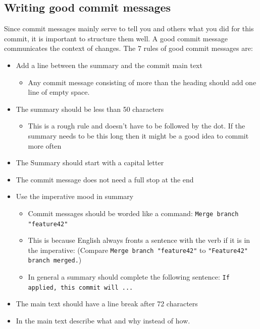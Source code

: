 \documentclass{article}
\begin{document}
	\subsection{Writing good commit messages}
	Since commit messages mainly serve to tell you and others what you did for this commit, it is important to structure them well. A good commit message communicates the context of changes. The 7 rules of good commit messages are:
	\begin{itemize}
		\item{Add a line between the summary and the commit main text}
		\begin{itemize}
			\item{Any commit message consisting of more than the heading should add one line of empty space.}
		\end{itemize}
		\item{The summary should be less than 50 characters}
		\begin{itemize}
			\item{This is a rough rule and doesn't have to be followed by the dot. If the summary needs to be this long then it might be a good idea to commit more often}
		\end{itemize}
		\item{The Summary should start with a capital letter}
		\item{The commit message does not need a full stop at the end}
		\item{Use the imperative mood in summary}
		\begin{itemize}
			\item{Commit messages should be worded like a command: \texttt{Merge branch "feature42"}}
			\item{This is because English always fronts a sentence with the verb if it is in the imperative: (Compare \texttt{Merge branch "feature42"} to \texttt{"Feature42" branch merged.})}
			\item{In general a summary should complete the following sentence: \texttt{If applied, this commit will ...}}
		\end{itemize}
		\item{The main text should have a line break after 72 characters}
		\item{In the main text describe what and why instead of how.}
	\end{itemize}
\end{document}
